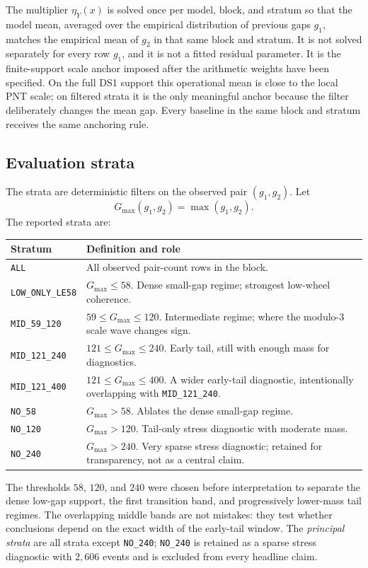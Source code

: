 \documentclass[10pt]{article}
\begin{document}
The multiplier $\eta_Y(x)$ is solved once per model, block, and stratum so that the model mean, averaged over the empirical distribution of previous gaps $g_1$, matches the empirical mean of $g_2$ in that same block and stratum.  It is not solved separately for every row $g_1$, and it is not a fitted residual parameter.  It is the finite-support scale anchor imposed after the arithmetic weights have been specified.  On the full DS1 support this operational mean is close to the local PNT scale; on filtered strata it is the only meaningful anchor because the filter deliberately changes the mean gap.  Every baseline in the same block and stratum receives the same anchoring rule.

\subsection{Evaluation strata}
The strata are deterministic filters on the observed pair $(g_1,g_2)$.  Let
\[
G_{\max}(g_1,g_2)=\max(g_1,g_2).
\]
The reported strata are:
\begin{center}\scriptsize
\begin{tabularx}{\textwidth}{>{\raggedright\arraybackslash}p{}>{\raggedright\arraybackslash}X}
\toprule
Stratum & Definition and role \\
\midrule
\texttt{ALL} & All observed pair-count rows in the block. \\
\texttt{LOW\_ONLY\_LE58} & $G_{\max}\le 58$.  Dense small-gap regime; strongest low-wheel coherence. \\
\texttt{MID\_59\_120} & $59\le G_{\max}\le 120$.  Intermediate regime; where the modulo-$3$ scale wave changes sign. \\
\texttt{MID\_121\_240} & $121\le G_{\max}\le 240$.  Early tail, still with enough mass for diagnostics. \\
\texttt{MID\_121\_400} & $121\le G_{\max}\le 400$.  A wider early-tail diagnostic, intentionally overlapping with \texttt{MID\_121\_240}. \\
\texttt{NO\_58} & $G_{\max}>58$.  Ablates the dense small-gap regime. \\
\texttt{NO\_120} & $G_{\max}>120$.  Tail-only stress diagnostic with moderate mass. \\
\texttt{NO\_240} & $G_{\max}>240$.  Very sparse stress diagnostic; retained for transparency, not as a central claim. \\
\bottomrule
\end{tabularx}
\end{center}
The thresholds $58$, $120$, and $240$ were chosen before interpretation to separate the dense low-gap support, the first transition band, and progressively lower-mass tail regimes.  The overlapping middle bands are not mistakes: they test whether conclusions depend on the exact width of the early-tail window.  The \emph{principal strata} are all strata except \texttt{NO\_240}; \texttt{NO\_240} is retained as a sparse stress diagnostic with $2{,}606$ events and is excluded from every headline claim.
\end{document}
